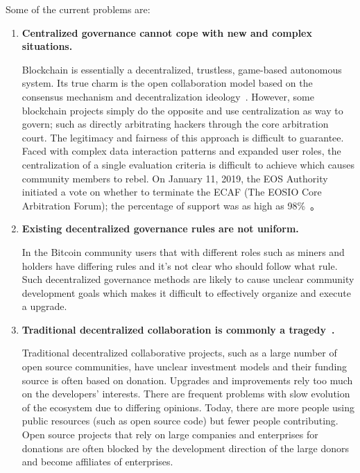Some of the current problems are:

\begin{enumerate}
	\item 

	\textbf{Centralized governance cannot cope with new and complex situations.}

	Blockchain is essentially a decentralized, trustless, game-based autonomous system. Its true charm is the open collaboration model based on the consensus mechanism and decentralization ideology~\cite{whitepaper}. However, some blockchain projects simply do the opposite and use centralization as way to govern; such as directly arbitrating hackers through the core arbitration court. The legitimacy and fairness of this approach is difficult to guarantee. Faced with complex data interaction patterns and expanded user roles, the centralization of a single evaluation criteria is difficult to achieve which causes community members to rebel. On January 11, 2019, the EOS Authority initiated a vote on whether to terminate the ECAF (The EOSIO Core Arbitration Forum); the percentage of support was as high as 98\%~\cite{DeleteECAF}。

	\item 

	\textbf{Existing decentralized governance rules are not uniform.}

	In the Bitcoin community users that with different roles such as miners and holders have differing rules and it's not clear who should follow what rule. Such decentralized governance methods are likely to cause unclear community development goals which makes it difficult to effectively organize and execute a upgrade.

	\item 

	\textbf{Traditional decentralized collaboration is commonly a tragedy~\cite{TragedyOfTheCommons}.}

	Traditional decentralized collaborative projects, such as a large number of open source communities, have unclear investment models and their funding source is often based on donation. Upgrades and improvements rely too much on the developers' interests. There are frequent problems with slow evolution of the ecosystem due to differing opinions. Today, there are more people using public resources (such as open source code) but fewer people contributing. Open source projects that rely on large companies and enterprises for donations are often blocked by the development direction of the large donors and become affiliates of enterprises.


\end{enumerate}

